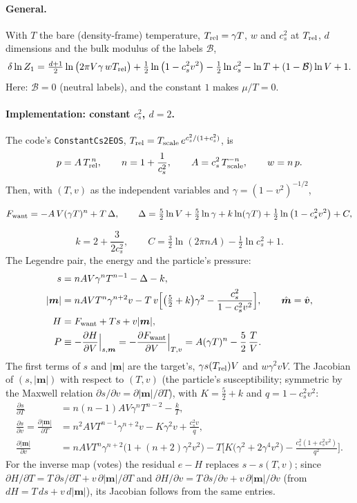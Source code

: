 \documentclass[11pt,aps,preprint,nofootinbib,superscriptaddress,tightenlines]{revtex4-2}
\newcommand{\klab}{\mathcal B}
\def\st{\begin{equation}}
\def\stp{\end{equation}}
\let\oldparagraph\paragraph
\renewcommand{\paragraph}{\par\bigskip\oldparagraph}
\begin{document}
\paragraph{General.}  With $T$ the bare (density-frame) temperature, $T_{\rm rel}=\gamma T$, $w$ and $c_s^2$ at $T_{\rm rel}$, $d$ dimensions and the bulk modulus
of the labels $\klab$,
\st
\delta\ln Z_1=\tfrac{d+1}2\ln\big(2\pi V\gamma\,wT_{\rm rel}\big)+\tfrac12\ln\big(1-c_s^2v^2\big)-\tfrac12\ln c_s^2-\ln T+(1-\klab)\ln V+1 .
\label{dlnZ}
\stp
Here: $\klab=0$ (neutral labels), and the constant $1$ makes $\mu/T=0$.

\paragraph{Implementation: constant $c_s^2$, $d=2$.}  The code's \texttt{ConstantCs2EOS}, $T_{\rm rel}=T_{\rm scale}\,e^{c_s^2/(1+c_s^2)}$, is
\st
p=A\,T_{\rm rel}^{\,n},\qquad n=1+\frac1{c_s^2},\qquad A=c_s^2\,T_{\rm scale}^{-n},\qquad w=n\,p .
\stp
Then, with $(T,v)$ as the independent variables and $\gamma=(1-v^2)^{-1/2}$,
\begin{keyeq}
\st
F_{\rm want}=-A\,V(\gamma T)^n+T\,\Delta,\qquad
\Delta=\tfrac52\ln V+\tfrac52\ln\gamma+k\ln(\gamma T)+\tfrac12\ln\big(1-c_s^2v^2\big)+C ,
\label{Fwant}
\stp
\end{keyeq}
\st
k=2+\frac3{2c_s^2},\qquad C=\tfrac32\ln(2\pi nA)-\tfrac12\ln c_s^2+1 .
\stp
The Legendre pair, the energy and the particle's pressure:
\begin{align}
s&=nAV\gamma^nT^{n-1}-\Delta-k , \label{s}\\
|\bm m|&=nAVT^n\gamma^{n+2}v-T\,v\Big[\big(\tfrac52+k\big)\gamma^2-\frac{c_s^2}{1-c_s^2v^2}\Big],\qquad \hat{\bm m}=\hat{\bm v} , \label{m}\\
H&=F_{\rm want}+Ts+v|\bm m| , \label{H}\\
P&\equiv-\frac{\partial H}{\partial V}\Big|_{s,\bm m}=-\frac{\partial F_{\rm want}}{\partial V}\Big|_{T,v}=A(\gamma T)^n-\frac52\,\frac TV . \label{P}
\end{align}
The first terms of $s$ and $|\bm m|$ are the target's, $\gamma s(T_{\rm rel})V$ and $w\gamma^2vV$.  The Jacobian of $(s,|\bm m|)$ with respect to $(T,v)$ (the
particle's susceptibility; symmetric by the Maxwell relation $\partial s/\partial v=\partial|\bm m|/\partial T$), with $K=\tfrac52+k$ and $q=1-c_s^2v^2$:
\begin{align}
\frac{\partial s}{\partial T}&=n(n-1)AV\gamma^nT^{n-2}-\frac kT ,\\
\frac{\partial s}{\partial v}=\frac{\partial|\bm m|}{\partial T}&=n^2AVT^{n-1}\gamma^{n+2}v-K\gamma^2v+\frac{c_s^2v}q ,\\
\frac{\partial|\bm m|}{\partial v}&=nAVT^n\gamma^{n+2}\big(1+(n+2)\gamma^2v^2\big)-T\Big[K\big(\gamma^2+2\gamma^4v^2\big)-\frac{c_s^2(1+c_s^2v^2)}{q^2}\Big] .
\end{align}
For the inverse map (votes) the residual $e-H$ replaces $s-s(T,v)$; since $\partial H/\partial T=T\,\partial s/\partial T+v\,\partial|\bm m|/\partial T$ and
$\partial H/\partial v=T\,\partial s/\partial v+v\,\partial|\bm m|/\partial v$ (from $dH=T\,ds+v\,d|\bm m|$), its Jacobian follows from the same entries.
\end{document}
